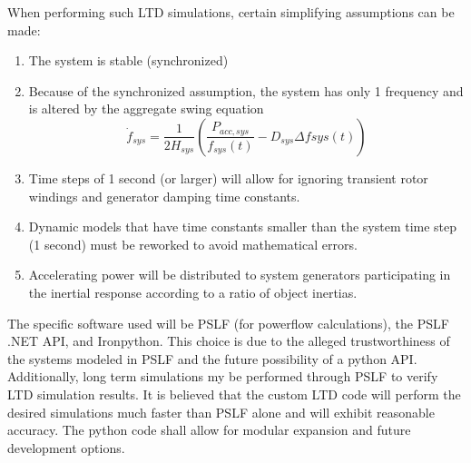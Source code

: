 \documentclass[12pt]{article}
\begin{document}
When performing such LTD simulations, certain simplifying assumptions can be made:
\begin{enumerate}
	\item The system is stable (synchronized)
	\item Because of the synchronized assumption, the system has only 1 frequency and is altered by the aggregate swing equation
	\[ \dot{f}_{sys} = \dfrac{1}{2H_{sys} } \left( \dfrac{P_{acc, sys} }{f_{sys}(t)} - D_{sys}\Delta f{sys}(t)  \right)  \]
	\item Time steps of 1 second (or larger) will allow for ignoring transient rotor windings and generator damping time constants. 
	\item Dynamic models that have time constants smaller than the system time step (1 second) must be reworked to avoid mathematical errors.
	\item Accelerating power will be distributed to system generators participating in the inertial response according to a ratio of object inertias.
\end{enumerate}

The specific software used will be PSLF (for powerflow calculations), the PSLF .NET API, and Ironpython. This choice is due to the alleged trustworthiness of the systems modeled in PSLF and the future possibility of a python API. Additionally, long term simulations my be performed through PSLF to verify LTD simulation results. It is believed that the custom LTD code will perform the desired simulations much faster than PSLF alone and will exhibit reasonable accuracy. The python code shall allow for modular expansion and future development options.

\pagebreak
\end{document}
